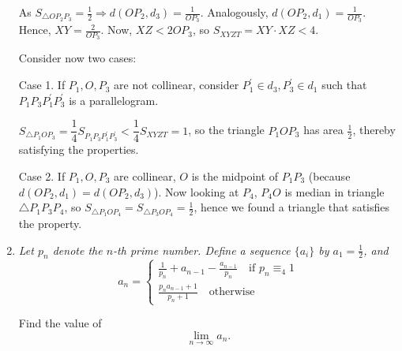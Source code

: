 \documentclass{article}
\begin{document}
\begin{enumerate}
As $S_{\triangle{OP_2P_3}}=\frac{1}{2}\Rightarrow d(OP_2,d_3)=\frac{1}{OP_3}$. Analogously, $ d(OP_2,d_1)=\frac{1}{OP_3}$. Hence, $XY=\frac{2}{OP_3}$. Now, $XZ<2OP_3$, so $S_{XYZT}=XY\cdot XZ<4$.

Consider now two cases:

Case 1. If $P_1,O,P_3$ are not collinear, consider $P_1^\prime \in d_3, P_3^\prime \in d_1$ such that $P_1P_3P_1^\prime P_3^\prime$ is a parallelogram.

$S_{\triangle{P_1OP_3}}=\dfrac{1}{4}S_{P_1P_3P_1^\prime P_3^\prime}<\dfrac{1}{4}S_{XYZT}=1$, so the triangle $P_1OP_3$ has area $\frac{1}{2}$, thereby satisfying the properties.

Case 2. If $P_1,O,P_3$ are collinear, $O$ is the midpoint of $P_1P_3$ (because $d(OP_2,d_1)=d(OP_2,d_3)$).
Now looking at $P_4$, $P_4O$ is median in triangle $\triangle{P_1P_3P_4}$, so $S_{\triangle{P_1OP_4}}=S_{\triangle{P_3OP_4}}=\frac{1}{2}$, hence we found a triangle that satisfies the property.

\medskip
\item %
{\itshape Let $p_n$ denote the $n$-th prime number. Define a sequence $\{a_i\}$ by $a_1 = \frac{1}{2}$, and
$$
a_n = 
\begin{cases}
	\frac{1}{p_n} + a_{n - 1} - \frac{a_{n - 1}}{p_n} \quad \text{if } p_n \equiv _4 1 \\
	\frac{p_na_{n - 1} + 1}{p_n + 1} \quad \text{otherwise}
\end{cases}
$$

Find the value of 
$$\lim_{n \to \infty} a_n.$$
}

\end{enumerate}
\end{document}
